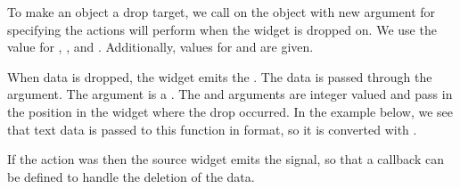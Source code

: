 To make an object a drop target, we call  on
the object with new argument  for
specifying the actions \GTK\/ will perform when the widget is dropped
on. We use the value  for , , and
. Additionally, values for
 and
 are given.

\begin{Schunk}
\end{Schunk}

When data is dropped, the widget emits the
. The data is passed through the
 argument. The  argument is a
. The  and  arguments are integer
valued and pass in the position in the widget where the drop
occurred. In the example below, we see that text data is passed to
this function in  format, so it is converted with
.

\begin{Schunk}
\end{Schunk}

If the action was  then the source widget emits the
 signal, so that a callback can be defined to
handle the deletion of the data.







